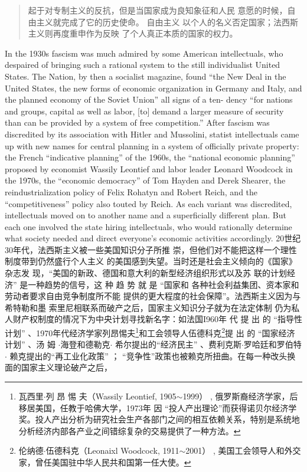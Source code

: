 \begin{paracol}{2}
\begin{quote}
起于对专制主义的反抗，但是当国家成为良知象征和人民
意愿的时候，自由主义就完成了它的历史使命。 自由主义
以个人的名义否定国家；法西斯主义则再度重申作为反映
了个人真正本质的国家的权力。
\end{quote}
\switchcolumn*
In the 1930s fascism was much admired by some American
intellectuals, who despaired of bringing such a rational system
to the still individualist United States. The Nation, by then a socialist magazine, found ``the New Deal in the United States, the
new forms of economic organization in Germany and Italy, and
the planned economy of the Soviet Union'' all signs of a ten-
dency ``for nations and groups, capital as well as labor, [to] demand a larger measure of security than can be provided by a
system of free competition.'' After fascism was discredited by its
association with Hitler and Mussolini, statist intellectuals came
up with new names for central planning in a system of officially
private property: the French ``indicative planning'' of the 1960s,
the ``national economic planning'' proposed by economist
Wassily Leontief and labor leader Leonard Woodcock in the
1970s, the ``economic democracy'' of Tom Hayden and Derek
Shearer, the reindustrialization policy of Felix Rohatyn and
Robert Reich, and the ``competitiveness'' policy also touted by
Reich. As each variant was discredited, intellectuals moved on
to another name and a superficially different plan. But each one
involved the state hiring intellectuals, who would rationally determine what society needed and direct everyone's economic activities accordingly.
\switchcolumn
20世纪30年代，法西斯主义被一些美国知识分子所推
崇，但他们对不能把这样一个理性制度带到仍然盛行个人主义
的美国感到失望。当时还是社会主义倾向的《国家》杂志发
现，“美国的新政、德国和意大利的新型经济组织形式以及苏
联的计划经济” 是一种趋势的信号，这 种 趋 势 就 是 “国家和
各种社会利益集团、资本家和劳动者要求自由竞争制度所不能
提供的更大程度的社会保障”。法西斯主义因为与希特勒和墨
索里尼相联系而破产之后，国家主义知识分子就为在法定体制
仍为私人财产权制度的情况下为中央计划寻找新名字：如法国I960年 代 提 出 的 “指导性计划” 、1970年代经济学家列昂惕夫\footnote{瓦西里$\cdot$列 昂 惕 夫（Wassily Leontief, 1905$\sim$1999） , 俄罗斯裔经济学家，后移居美国，任教于哈佛大学，1973年 因 “投人产出理论”而获得诺贝尔经济学奖。投人产出分析为研究社会生产各部门之间的相互依赖关系，特别是系统地分析经济内部各产业之间错综复杂的交易提供了一种方法。}和工会领导人伍德科克\footnote{伦纳德$\cdot$伍德科克（Leonaixl Woodcock, 1911$\sim$2001） , 美国工会领导人和外交家，曾任美国驻中华人民共和国第一任大使。}提 出 的 “国家经济计划” 、汤 姆 $\cdot$海登和德勒克$\cdot$ 希尔提出的“经济民主” 、费利克斯$\cdot$罗哈廷和罗伯特$\cdot$ 赖克提出的“再工业化政策” ； “竞争性”政策也被赖克所扭曲。在每一种改头换面的国家主义理论破产之后，

\end{paracol}
